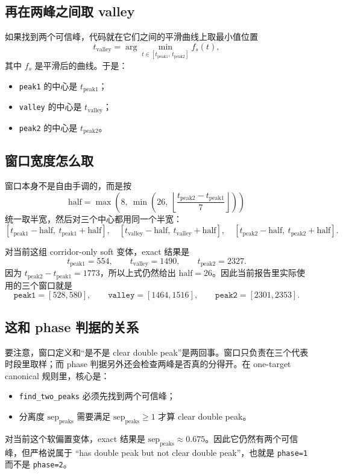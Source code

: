 \documentclass[11pt,fontset=fandol]{ctexart}
\begin{document}
\subsection{再在两峰之间取 valley}
如果找到两个可信峰，代码就在它们之间的平滑曲线上取最小值位置
\[
t_{\mathrm{valley}}=\arg\min_{t\in[t_{\mathrm{peak1}},\,t_{\mathrm{peak2}}]} f_s(t),
\]
其中 \(f_s\) 是平滑后的曲线。于是：
\begin{itemize}
  \item \texttt{peak1} 的中心是 \(t_{\mathrm{peak1}}\)；
  \item \texttt{valley} 的中心是 \(t_{\mathrm{valley}}\)；
  \item \texttt{peak2} 的中心是 \(t_{\mathrm{peak2}}\)。
\end{itemize}

\subsection{窗口宽度怎么取}
窗口本身不是自由手调的，而是按
\[
\mathrm{half}=\max\!\left(8,\ \min\!\left(26,\ \left\lfloor\frac{t_{\mathrm{peak2}}-t_{\mathrm{peak1}}}{7}\right\rfloor\right)\right)
\]
统一取半宽，然后对三个中心都用同一个半宽：
\[
[t_{\mathrm{peak1}}-\mathrm{half},\ t_{\mathrm{peak1}}+\mathrm{half}],
\quad
[t_{\mathrm{valley}}-\mathrm{half},\ t_{\mathrm{valley}}+\mathrm{half}],
\quad
[t_{\mathrm{peak2}}-\mathrm{half},\ t_{\mathrm{peak2}}+\mathrm{half}].
\]

对当前这组 corridor-only soft 变体，exact 结果是
\[
t_{\mathrm{peak1}}=554,\qquad t_{\mathrm{valley}}=1490,\qquad t_{\mathrm{peak2}}=2327.
\]
因为 \(t_{\mathrm{peak2}}-t_{\mathrm{peak1}}=1773\)，所以上式仍然给出 \(\mathrm{half}=26\)。因此当前报告里实际使用的三个窗口就是
\[
\texttt{peak1}=[528,580],\qquad
\texttt{valley}=[1464,1516],\qquad
\texttt{peak2}=[2301,2353].
\]

\subsection{这和 phase 判据的关系}
要注意，窗口定义和“是不是 clear double peak”是两回事。窗口只负责在三个代表时段里取样；而 phase 判据另外还会检查两峰是否真的分得开。在 one-target canonical 规则里，核心是：
\begin{itemize}
  \item \texttt{find\_two\_peaks} 必须先找到两个可信峰；
  \item 分离度 \(\mathrm{sep}_{\mathrm{peaks}}\) 需要满足 \(\mathrm{sep}_{\mathrm{peaks}}\ge 1\) 才算 clear double peak。
\end{itemize}
对当前这个软偏置变体，exact 结果是 \(\mathrm{sep}_{\mathrm{peaks}}\approx 0.675\)。因此它仍然有两个可信峰，但严格说属于 ``has double peak but not clear double peak''，也就是 \texttt{phase=1} 而不是 \texttt{phase=2}。
\end{document}
